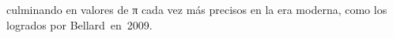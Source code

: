 \documentclass[preview]{standalone}
\begin{document}
\begin{center}
culminando en valores de π cada vez más precisos en la era moderna, como los logrados por Bellard en 2009.
\end{center}
\end{document}
